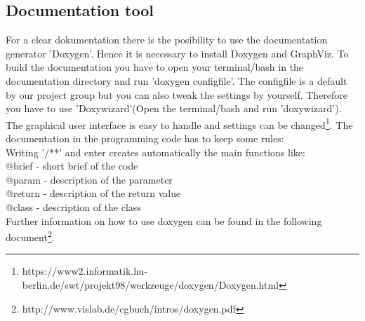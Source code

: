 \subsection{Documentation tool}\label{subsec:code documentation}
For a clear dokumentation there is the posibility to use the documentation generator 'Doxygen'. Hence it is necessary to install Doxygen and GraphViz. To build the documentation you have to open your terminal/bash in the documentation directory and run 'doxygen configfile'.
The configfile is a default by our project group but you can also tweak the settings by yourself. Therefore you have to use 'Doxywizard'(Open the terminal/bash and run 'doxywizard'). The graphical user interface is easy to handle and settings can be changed\footnote{https://www2.informatik.hu-berlin.de/swt/projekt98/werkzeuge/doxygen/Doxygen.html}.
The documentation in the programming code has to keep some rules: \\

Writing '/**' and enter creates automatically the main functions like: \\
@brief - short brief of the code \\
@param - description of the parameter \\
@return - description of the return value \\
@class - description of the class \\

Further information on how to use doxygen can be found in the following document\footnote{http://www.vislab.de/cgbuch/intros/doxygen.pdf}.